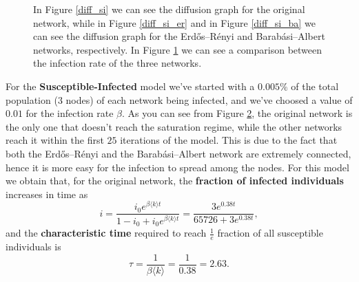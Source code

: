 \begin{figure}[H]
        \begin{subfigure}{0.45\textwidth}
            \caption{}
            \label{diff_si_comparison}
        \end{subfigure}
        \caption{In Figure \ref{diff_si} we can see the diffusion graph for the original network, while in Figure
        \ref{diff_si_er} and in Figure \ref{diff_si_ba} we can see the diffusion graph for the Erdős–Rényi and
        Barabási–Albert networks, respectively. In Figure \ref{diff_si_comparison} we can see a comparison between
        the infection rate of the three networks.}
        \label{diff_si_total}
    \end{figure}
    For the \textbf{Susceptible-Infected} model we've started with a $0.005\%$ of the total population ($3$ nodes)
    of each network being infected, and we've choosed a value of $0.01$ for the infection rate $\beta$. As you can
    see from Figure \ref{diff_si_total}, the original network is the only one that doesn't reach the saturation
    regime, while the other networks reach it within the first $25$ iterations of the model. This is due to the fact
    that both the Erdős–Rényi and the Barabási–Albert network are extremely connected, hence it is more easy for the
    infection to spread among the nodes. For this model we obtain that, for the original network, the
    \textbf{fraction of infected individuals} increases in time as
    \begin{equation*}
        i = \frac{i_0 e^{\beta\langle k \rangle t}}{1 - i_0 + i_0 e^{\beta\langle k \rangle t}} =
        \frac{3 e^{0.38t}}{65726 + 3 e^{0.38t}},
    \end{equation*}
    and the \textbf{characteristic time} required to reach $\frac{1}{e}$ fraction of all susceptible individuals is
    \begin{equation*}
        \tau = \frac{1}{\beta\langle k \rangle} = \frac{1}{0.38} = 2.63.
    \end{equation*}

